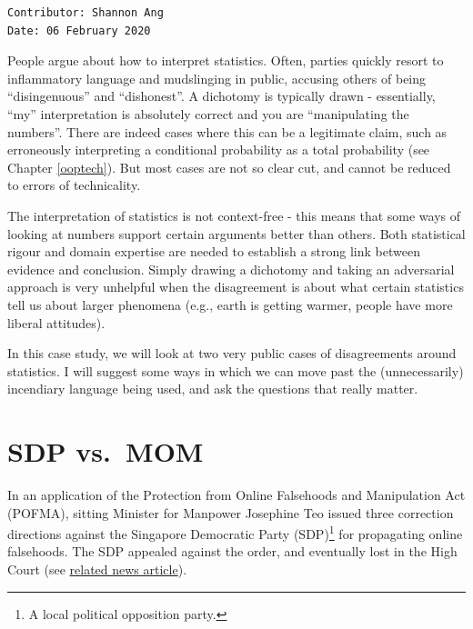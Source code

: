 \documentclass[openany]{book}
\let\rmarkdownfootnote\footnote%
\def\footnote{\protect\rmarkdownfootnote}
\begin{document}
\begin{verbatim}
Contributor: Shannon Ang
Date: 06 February 2020
\end{verbatim}

People argue about how to interpret statistics. Often, parties quickly
resort to inflammatory language and mudslinging in public, accusing
others of being ``disingenuous'' and ``dishonest''. A dichotomy is
typically drawn - essentially, ``my'' interpretation is absolutely
correct and you are ``manipulating the numbers''. There are indeed cases
where this can be a legitimate claim, such as erroneously interpreting a
conditional probability as a total probability (see Chapter
\ref{ooptech}). But most cases are not so clear cut, and cannot be
reduced to errors of technicality.

The interpretation of statistics is not context-free - this means that
some ways of looking at numbers support certain arguments better than
others. Both statistical rigour and domain expertise are needed to
establish a strong link between evidence and conclusion. Simply drawing
a dichotomy and taking an adversarial approach is very unhelpful when
the disagreement is about what certain statistics tell us about larger
phenomena (e.g., earth is getting warmer, people have more liberal
attitudes).

In this case study, we will look at two very public cases of
disagreements around statistics. I will suggest some ways in which we
can move past the (unnecessarily) incendiary language being used, and
ask the questions that really matter.

\section{SDP vs.~MOM}\label{pofmasdp}

In an application of the Protection from Online Falsehoods and
Manipulation Act (POFMA), sitting Minister for Manpower Josephine Teo
issued three correction directions against the Singapore Democratic
Party (SDP)\footnote{A local political opposition party.} for
propagating online falsehoods. The SDP appealed against the order, and
eventually lost in the High Court (see
\href{https://www.channelnewsasia.com/news/singapore/judge-dismisses-sdp-s-pofma-challenge-says-statements-were-false-12394932}{related
news article}).
\end{document}
